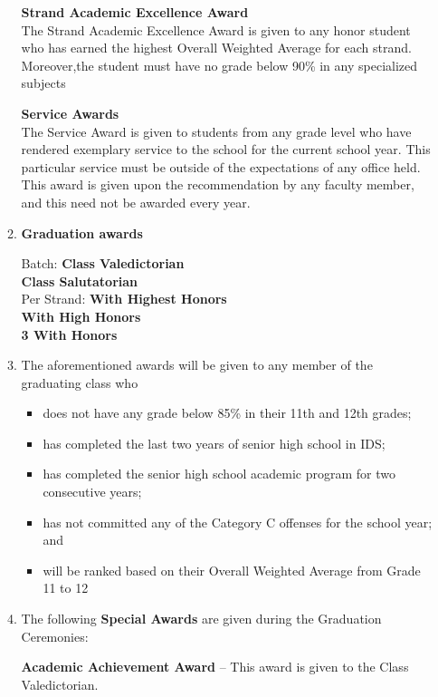 \begin{enumerate}[label=(\Alph*)]
\begin{enumerate}[label=\Alph{enumi}.\arabic*]
		\textbf{Strand Academic Excellence Award} \\
		The Strand Academic Excellence Award is given to any honor student who has earned the highest Overall Weighted Average for each strand. Moreover,the student must have no grade below 90\% in any specialized subjects
		
		\textbf{Service Awards} \\
		The Service Award is given to students from any grade level who have rendered exemplary service to the school for the current school year. This particular service must be outside of the expectations of any office held. This award is given upon the recommendation by any faculty member, and this need not be awarded every year. 
		
		\item \textbf{Graduation awards} \\
		\begin{center}
			Batch: \qquad \qquad \textbf{Class Valedictorian} \\
			\qquad \qquad \qquad \quad \textbf{Class Salutatorian} \\
			Per Strand: \qquad \qquad \textbf{With Highest Honors} \\
			\qquad \qquad \qquad \quad \quad \textbf{With High Honors} \\
			\qquad \qquad \qquad  \textbf{3 With Honors}
		\end{center}
		
		\item  The aforementioned awards will be given to any member of the graduating class
		who
		\begin{itemize}
			\item  does not have any grade below 85\% in their 11th and 12th grades;
			\item  has completed the last two years of senior high school in IDS;
			\item  has completed the senior high school academic program for two
			consecutive years; 
			\item  has not committed any of the Category C offenses for the school year; and
			\item  will be ranked based on their Overall Weighted Average from Grade 11 to
			12
		\end{itemize}
		\item The following \textbf{Special Awards} are given during the Graduation Ceremonies:
		
		\textbf{Academic Achievement Award} – This award is given to the Class Valedictorian.
		

\end{enumerate}
\end{enumerate}

